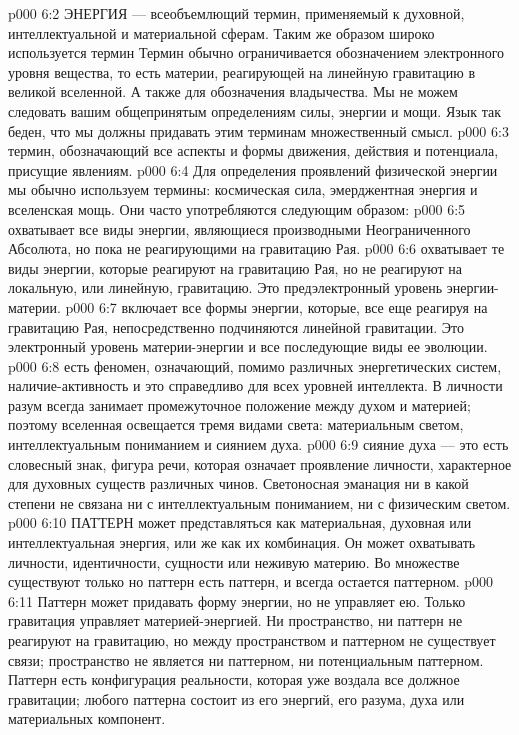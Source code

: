 \vs p000 6:2 \pc ЭНЕРГИЯ --- всеобъемлющий термин, применяемый к духовной, интеллектуальной и материальной сферам. Таким же образом широко используется термин  Термин  обычно ограничивается обозначением электронного уровня вещества, то есть материи, реагирующей на линейную гравитацию в великой вселенной. А также для обозначения владычества. Мы не можем следовать вашим общепринятым определениям силы, энергии и мощи. Язык так беден, что мы должны придавать этим терминам множественный смысл.
\vs p000 6:3 \pc {} термин, обозначающий все аспекты и формы движения, действия и потенциала, присущие явлениям.
\vs p000 6:4 Для определения проявлений физической энергии мы обычно используем термины: космическая сила, эмерджентная энергия и вселенская мощь. Они часто употребляются следующим образом:
\vs p000 6:5 \bibnobreakspace {} охватывает все виды энергии, являющиеся производными Неограниченного Абсолюта, но пока не реагирующими на гравитацию Рая.
\vs p000 6:6 \bibnobreakspace {} охватывает те виды энергии, которые реагируют на гравитацию Рая, но не реагируют на локальную, или линейную, гравитацию. Это предэлектронный уровень энергии\hyp{}материи.
\vs p000 6:7 \bibnobreakspace {} включает все формы энергии, которые, все еще реагируя на гравитацию Рая, непосредственно подчиняются линейной гравитации. Это электронный уровень материи\hyp{}энергии и все последующие виды ее эволюции.
\vs p000 6:8 \pc {} есть феномен, означающий, помимо различных энергетических систем, наличие\hyp{}активность  и это справедливо для всех уровней интеллекта. В личности разум всегда занимает промежуточное положение между духом и материей; поэтому вселенная освещается тремя видами света: материальным светом, интеллектуальным пониманием и сиянием духа.
\vs p000 6:9 \pc {} сияние духа --- это есть словесный знак, фигура речи, которая означает проявление личности, характерное для духовных существ различных чинов. Светоносная эманация ни в какой степени не связана ни с интеллектуальным пониманием, ни с физическим светом.
\vs p000 6:10 \pc ПАТТЕРН может представляться как материальная, духовная или интеллектуальная энергия, или же как их комбинация. Он может охватывать личности, идентичности, сущности или неживую материю. Во множестве существуют только  но паттерн есть паттерн, и всегда остается паттерном.
\vs p000 6:11 Паттерн может придавать форму энергии, но не управляет ею. Только гравитация управляет материей\hyp{}энергией. Ни пространство, ни паттерн не реагируют на гравитацию, но между пространством и паттерном не существует связи; пространство не является ни паттерном, ни потенциальным паттерном. Паттерн есть конфигурация реальности, которая уже воздала все должное гравитации;  любого паттерна состоит из его энергий, его разума, духа или материальных компонент.
